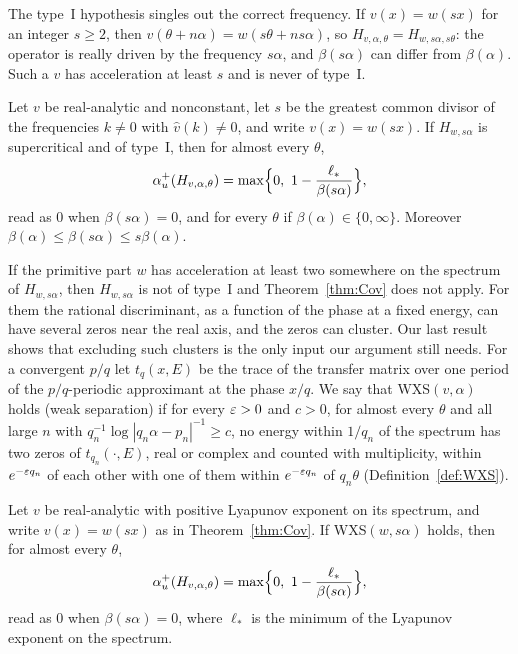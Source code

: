 The type~I hypothesis singles out the correct frequency. If $v(x)=w(sx)$ for an integer $s\ge2$, then $v(\theta+n\alpha)=w(s\theta+ns\alpha)$, so $H_{v,\alpha,\theta}=H_{w,s\alpha,s\theta}$: the operator is really driven by the frequency $s\alpha$, and $\beta(s\alpha)$ can differ from $\beta(\alpha)$. Such a $v$ has acceleration at least $s$ and is never of type~I.

\begin{maintheorem}[Covariance]\label{thm:Cov}
Let $v$ be real-analytic and nonconstant, let $s$ be the greatest common divisor of the frequencies $k\ne0$ with $\hat v(k)\ne0$, and write $v(x)=w(sx)$. If $H_{w,s\alpha}$ is supercritical and of type~I, then for almost every $\theta$,
\[
\au(H_{v,\alpha,\theta})=\max\Bigl\{0,\ 1-\frac{\ell_*}{\beta(s\alpha)}\Bigr\},
\]
read as $0$ when $\beta(s\alpha)=0$, and for every $\theta$ if $\beta(\alpha)\in\{0,\infty\}$. Moreover $\beta(\alpha)\le\beta(s\alpha)\le s\beta(\alpha)$.
\end{maintheorem}

If the primitive part $w$ has acceleration at least two somewhere on the spectrum of $H_{w,s\alpha}$, then $H_{w,s\alpha}$ is not of type~I and Theorem~\ref{thm:Cov} does not apply. For them the rational discriminant, as a function of the phase at a fixed energy, can have several zeros near the real axis, and the zeros can cluster. Our last result shows that excluding such clusters is the only input our argument still needs. For a convergent $p/q$ let $t_q(x,E)$ be the trace of the transfer matrix over one period of the $p/q$-periodic approximant at the phase $x/q$. We say that WXS$(v,\alpha)$ holds (weak separation) if for every $\varepsilon>0$ and $c>0$, for almost every $\theta$ and all large $n$ with $q_n^{-1}\log|q_n\alpha-p_n|^{-1}\ge c$, no energy within $1/q_n$ of the spectrum has two zeros of $t_{q_n}(\cdot,E)$, real or complex and counted with multiplicity, within $e^{-\varepsilon q_n}$ of each other with one of them within $e^{-\varepsilon q_n}$ of $q_n\theta$ (Definition~\ref{def:WXS}).

\begin{maintheorem}\label{thm:D}
Let $v$ be real-analytic with positive Lyapunov exponent on its spectrum, and write $v(x)=w(sx)$ as in Theorem~\ref{thm:Cov}. If WXS$(w,s\alpha)$ holds, then for almost every $\theta$,
\[
\au(H_{v,\alpha,\theta})=\max\Bigl\{0,\ 1-\frac{\ell_*}{\beta(s\alpha)}\Bigr\},
\]
read as $0$ when $\beta(s\alpha)=0$, where $\ell_*$ is the minimum of the Lyapunov exponent on the spectrum.
\end{maintheorem}

